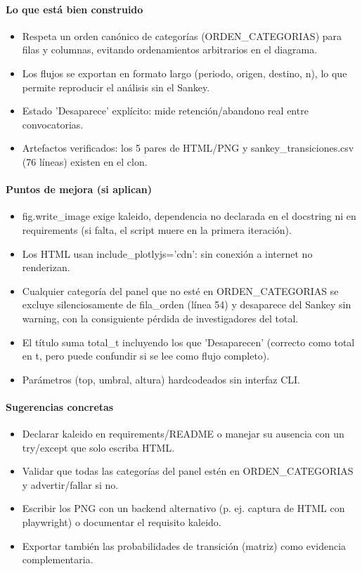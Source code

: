 \paragraph{Lo que está bien construido}
\begin{itemize}
  \item Respeta un orden canónico de categorías (ORDEN\_CATEGORIAS) para filas y columnas, evitando ordenamientos arbitrarios en el diagrama.
  \item Los flujos se exportan en formato largo (periodo, origen, destino, n), lo que permite reproducir el análisis sin el Sankey.
  \item Estado 'Desaparece' explícito: mide retención/abandono real entre convocatorias.
  \item Artefactos verificados: los 5 pares de HTML/PNG y sankey\_transiciones.csv (76 líneas) existen en el clon.
\end{itemize}

\paragraph{Puntos de mejora (si aplican)}
\begin{itemize}
  \item fig.write\_image exige kaleido, dependencia no declarada en el docstring ni en requirements (si falta, el script muere en la primera iteración).
  \item Los HTML usan include\_plotlyjs='cdn': sin conexión a internet no renderizan.
  \item Cualquier categoría del panel que no esté en ORDEN\_CATEGORIAS se excluye silenciosamente de fila\_orden (línea 54) y desaparece del Sankey sin warning, con la consiguiente pérdida de investigadores del total.
  \item El título suma total\_t incluyendo los que 'Desaparecen' (correcto como total en t, pero puede confundir si se lee como flujo completo).
  \item Parámetros (top, umbral, altura) hardcodeados sin interfaz CLI.
\end{itemize}

\paragraph{Sugerencias concretas}
\begin{itemize}
  \item Declarar kaleido en requirements/README o manejar su ausencia con un try/except que solo escriba HTML.
  \item Validar que todas las categorías del panel estén en ORDEN\_CATEGORIAS y advertir/fallar si no.
  \item Escribir los PNG con un backend alternativo (p. ej. captura de HTML con playwright) o documentar el requisito kaleido.
  \item Exportar también las probabilidades de transición (matriz) como evidencia complementaria.
\end{itemize}

